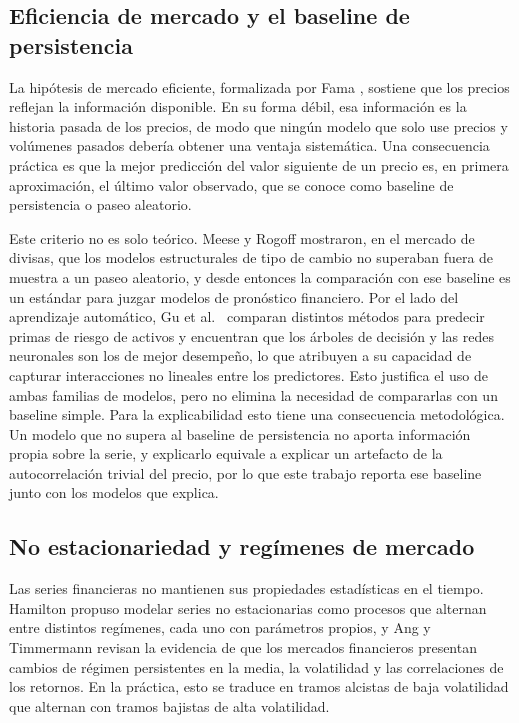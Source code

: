 \subsection{Eficiencia de mercado y el baseline de persistencia}
\label{sec:mt_eficiencia}

La hipótesis de mercado eficiente, formalizada por Fama \cite{fama1970}, sostiene que los precios reflejan la información disponible. En su forma débil, esa información es la historia pasada de los precios, de modo que ningún modelo que solo use precios y volúmenes pasados debería obtener una ventaja sistemática. Una consecuencia práctica es que la mejor predicción del valor siguiente de un precio es, en primera aproximación, el último valor observado, que se conoce como baseline de persistencia o paseo aleatorio.

Este criterio no es solo teórico. Meese y Rogoff \cite{meese1983} mostraron, en el mercado de divisas, que los modelos estructurales de tipo de cambio no superaban fuera de muestra a un paseo aleatorio, y desde entonces la comparación con ese baseline es un estándar para juzgar modelos de pronóstico financiero. Por el lado del aprendizaje automático, Gu et al.\ \cite{gu2020} comparan distintos métodos para predecir primas de riesgo de activos y encuentran que los árboles de decisión y las redes neuronales son los de mejor desempeño, lo que atribuyen a su capacidad de capturar interacciones no lineales entre los predictores. Esto justifica el uso de ambas familias de modelos, pero no elimina la necesidad de compararlas con un baseline simple. Para la explicabilidad esto tiene una consecuencia metodológica. Un modelo que no supera al baseline de persistencia no aporta información propia sobre la serie, y explicarlo equivale a explicar un artefacto de la autocorrelación trivial del precio, por lo que este trabajo reporta ese baseline junto con los modelos que explica.

\subsection{No estacionariedad y regímenes de mercado}
\label{sec:mt_regimenes}

Las series financieras no mantienen sus propiedades estadísticas en el tiempo. Hamilton \cite{hamilton1989} propuso modelar series no estacionarias como procesos que alternan entre distintos regímenes, cada uno con parámetros propios, y Ang y Timmermann \cite{angtimmermann2012} revisan la evidencia de que los mercados financieros presentan cambios de régimen persistentes en la media, la volatilidad y las correlaciones de los retornos. En la práctica, esto se traduce en tramos alcistas de baja volatilidad que alternan con tramos bajistas de alta volatilidad.

